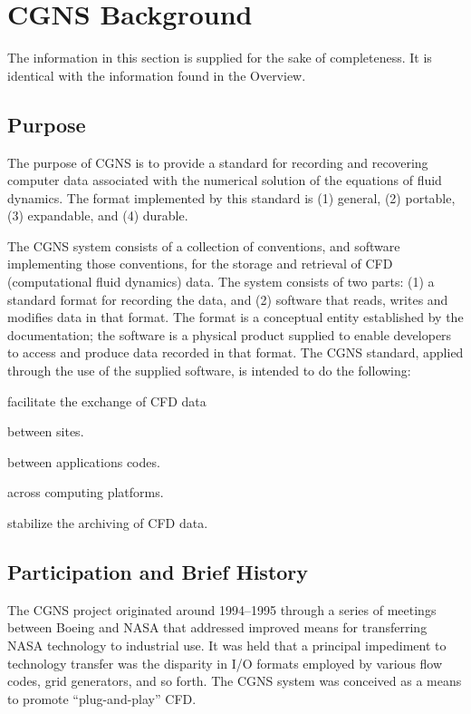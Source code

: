 \section{CGNS Background}
\label{s:background}
\thispagestyle{plain}

The information in this section is supplied for the sake of
completeness. It is identical with the information found in the
Overview.

\subsection{Purpose}

The purpose of CGNS is to provide a standard for recording and
recovering computer data associated with the numerical solution of the
equations of fluid dynamics. The format implemented by this standard is
(1) general, (2) portable, (3) expandable, and (4) durable.

The CGNS system consists of a collection of conventions, and software
implementing those conventions, for the storage and retrieval of
CFD (computational fluid dynamics) data. The system consists of two
parts: (1) a standard format for recording the data, and (2) software
that reads, writes and modifies data in that format.  The format is a
conceptual entity established by the documentation; the software is a
physical product supplied to enable developers to access and produce
data recorded in that format. The CGNS standard, applied through the use
of the supplied software, is intended to do the following:

\begin{itemize*}
\item facilitate the exchange of CFD data
      \begin{itemize*}
      \item between sites.
      \item between applications codes.
      \item across computing platforms.
      \end{itemize*}
\item stabilize the archiving of CFD data.
\end{itemize*}

\subsection{Participation and Brief History}

The CGNS project originated around 1994--1995 through a series of
meetings between Boeing and NASA that addressed improved means for
transferring NASA technology to industrial use. It was held that
a principal impediment to technology transfer was the disparity
in I/O formats employed by various flow codes, grid generators,
and so forth. The CGNS system was conceived as a means to promote
``plug-and-play'' CFD.

